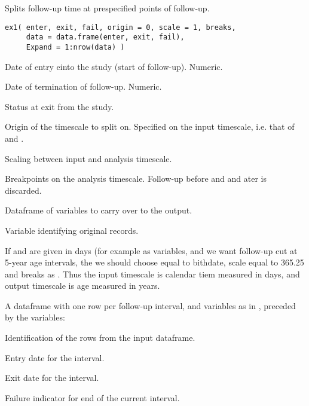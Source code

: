 \begin{Description}\relax
Splits follow-up time at prespecified points of follow-up.
\end{Description}
\begin{Usage}
\begin{verbatim}
ex1( enter, exit, fail, origin = 0, scale = 1, breaks,
     data = data.frame(enter, exit, fail),
     Expand = 1:nrow(data) )
\end{verbatim}
\end{Usage}
\begin{Arguments}
\begin{ldescription}
\item[\code{enter}] Date of entry einto the study (start of follow-up). Numeric.
\item[\code{exit}] Date of termination of follow-up. Numeric.
\item[\code{fail}] Status at exit from the study.
\item[\code{origin}] Origin of the timescale to split on. Specified on the
input timescale, i.e. that of  and .
\item[\code{scale}] Scaling between input and analysis timescale.
\item[\code{breaks}] Breakpoints on the analysis timescale. Follow-up before
 and and ater  is discarded.
\item[\code{data}] Dataframe of variables to carry over to the output.
\item[\code{Expand}] Variable identifying original records.
\end{ldescription}
\end{Arguments}
\begin{Details}\relax
If  and  are given in days (for example as
 variables, and we want follow-up cut at 5-year age
intervals, the we should choose  equal to bithdate, scale
equal to 365.25 and breaks as . Thus the input
timescale is calendar tiem measured in days, and output timescale is
age measured in years.
\end{Details}
\begin{Value}
A dataframe with one row per follow-up interval, and variables as in
, preceded by the variables:
\begin{ldescription}
\item[\code{Expand}] Identification of the rows from the input dataframe.
\item[\code{Enter}] Entry date for the interval.
\item[\code{Exit}] Exit date for the interval.
\item[\code{Fail}] Failure indicator for end of the current interval.
\end{ldescription}
\end{Value}
